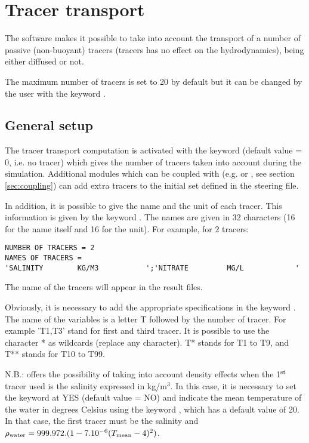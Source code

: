 \chapter{Tracer transport}
\label{ch:tra:trans}

The  software makes it possible to take into account the transport
of a number of passive (non-buoyant) tracers (tracers has no effect on the
hydrodynamics), being either diffused or not.

The maximum number of tracers is set to 20 by default but it can be changed by
the user with the keyword .

\section{General setup}

The tracer transport computation is activated with the keyword
 (default value = 0, i.e. no tracer)
which gives the number of tracers taken into account during the simulation.
Additional modules which can be coupled with 
(e.g. \waqtel or \gaia, see section \ref{sec:coupling})
can add extra tracers to the initial set defined in the 
steering file.

In addition, it is possible to give the name and the unit of each tracer.
This information is given by the keyword .
The names are given in 32 characters (16 for the name itself and 16 for the
unit).
For example, for 2 tracers:
\begin{lstlisting}[language=TelemacCas]
NUMBER OF TRACERS = 2
NAMES OF TRACERS =
'SALINITY        KG/M3           ';'NITRATE         MG/L            '
\end{lstlisting}

The name of the tracers will appear in the result files.

Obviously, it is necessary to add the appropriate specifications
in the keyword .
The name of the variables is a letter T followed by the number of tracer.
For example 'T1,T3' stand for first and third tracer.
It is possible to use the character * as wildcards (replace any character).
T* stands for T1 to T9, and T** stands for T10 to T99.

N.B.:  offers the possibility of taking into account density effects
when the 1$^{\rm{st}}$ tracer used is the salinity expressed in kg/m$^3$.
In this case, it is necessary to set the keyword 
at YES (default value = NO) and indicate the mean temperature of the water
in degrees Celsius using the keyword ,
which has a default value of 20.
In that case, the first tracer must be the salinity
and $\rho_{\rm{water}} = 999.972.(1-7.10^{-6}(T_{\rm{mean}}-4)^2)$.

